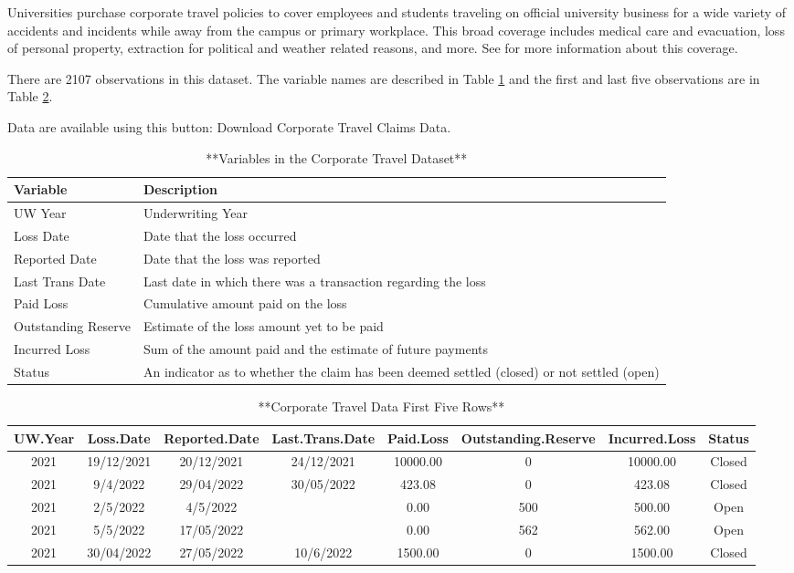\documentclass[
]{book}
\begin{document}
Universities purchase corporate travel policies to cover employees and students traveling on official university business for a wide variety of accidents and incidents while away from the campus or primary workplace. This broad coverage includes medical care and evacuation, loss of personal property, extraction for political and weather related reasons, and more. See \citet{frees2022ANURisks} for more information about this coverage.

There are 2107 observations in this dataset. The variable names are described in Table \ref{tab:DescribeTravel} and the first and last five observations are in Table \ref{tab:PrintNumTravel}.

Data are available using this button:
Download Corporate Travel Claims Data.

\begin{table}

\caption{\label{tab:DescribeTravel}**Variables in the Corporate Travel Dataset**}
\centering
\begin{tabular}[t]{ll}
\toprule
Variable & Description\\
\midrule
UW Year & Underwriting Year\\
Loss Date & Date that the loss occurred\\
Reported Date & Date that the loss was reported\\
Last Trans Date & Last date in which there was a transaction regarding the loss\\
Paid Loss & Cumulative amount paid on the loss\\
\addlinespace
Outstanding Reserve & Estimate of the loss amount yet to be paid\\
Incurred Loss & Sum of the amount paid and the estimate of future payments\\
Status & An indicator as to whether the claim has been deemed settled (closed) or not settled (open)\\
\bottomrule
\end{tabular}
\end{table}

\begin{table}

\caption{\label{tab:PrintNumTravel}**Corporate Travel Data First Five Rows**}
\centering
\begin{tabular}[t]{c|c|c|c|c|c|c|c}
\hline
UW.Year & Loss.Date & Reported.Date & Last.Trans.Date & Paid.Loss & Outstanding.Reserve & Incurred.Loss & Status\\
\hline
2021 & 19/12/2021 & 20/12/2021 & 24/12/2021 & 10000.00 & 0 & 10000.00 & Closed\\
\hline
2021 & 9/4/2022 & 29/04/2022 & 30/05/2022 & 423.08 & 0 & 423.08 & Closed\\
\hline
2021 & 2/5/2022 & 4/5/2022 &  & 0.00 & 500 & 500.00 & Open\\
\hline
2021 & 5/5/2022 & 17/05/2022 &  & 0.00 & 562 & 562.00 & Open\\
\hline
2021 & 30/04/2022 & 27/05/2022 & 10/6/2022 & 1500.00 & 0 & 1500.00 & Closed\\
\hline
\end{tabular}
\end{table}
\end{document}
